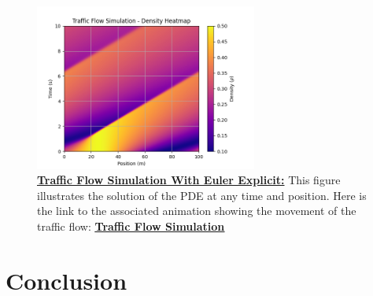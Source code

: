 \documentclass{beamer}
\begin{document}
\begin{frame}
	\begin{figure}[H]
		\centering
		\includegraphics[width=0.65\textwidth]{traffic_flow_density_map.png}
		\caption[Traffic Flow Simulation With Euler Explicit]{\textbf{\underline{Traffic Flow Simulation With Euler Explicit:}} This figure illustrates the solution of the PDE at any time and position. Here is the link to the associated animation showing the movement of the traffic flow: \href{https://github.com/FlorentGerbaud/Simple-road-traffic-modeling/blob/Flo-PDE/SRTM/EDPMethod/CasTestToLaunch/TestToLaunch/Modele_IC_S/EulerExplicit/traffic_flow_animation.gif}{\textbf{\underline{Traffic Flow Simulation}}} }
		\label{fig:traffic_flow_density_map}
	\end{figure}
\end{frame}

\section{Conclusion}
\end{document}
